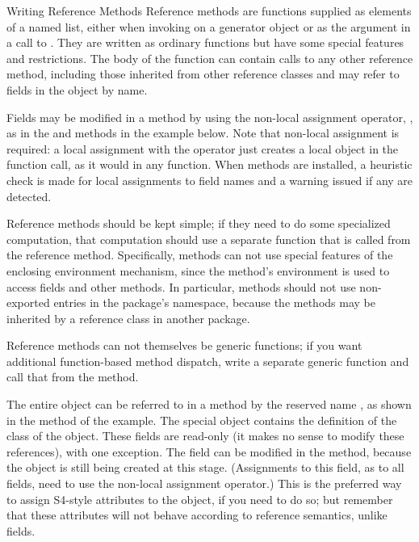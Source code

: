 \begin{Section}{Writing Reference Methods}
Reference methods are functions supplied as elements of a named list,
either
when invoking  
on a generator object  or as
the argument  in a call to .
They are written as ordinary \R{} functions but have some special
features and restrictions.
The body of the function can contain calls to any other reference method,
including those inherited from other reference classes and may refer
to fields in the object by name.

Fields may be modified in a method by using the
non-local assignment operator, \code{<{}<-}, as in the  and 
methods in the example below.
Note that non-local assignment is required:  a local assignment with
the \code{<-} operator just creates a local object in the function
call, as it would in any \R{} function.
When methods are installed, a heuristic check is made for local
assignments to field names and a warning issued if any are detected.

Reference methods should be kept simple; if they need to do some
specialized \R{} computation, that computation should use a separate \R{}
function that is called from the reference method.
Specifically, methods can not use special features of the
enclosing environment mechanism, since the method's environment is
used to access fields and other methods.
In particular, methods should not use non-exported entries in the
package's namespace, because the methods may be inherited by a
reference class in another package.

Reference methods can not themselves be generic functions; if you want
additional function-based method dispatch, write a separate generic
function and call that from the method.

The entire object can be referred to in a method by the reserved
name , as shown in the  method of the
example.
The special object  contains the definition of the
class of the object.
These fields are read-only (it makes no sense to modify these
references), with one exception.
The  field can be modified in the  
method, because the object is still being created at this stage.
(Assignments to this field, as to all fields, need to use the
non-local assignment operator.)
This is the preferred way to assign S4-style attributes to the object,
if you need to do so; but remember that these attributes will not
behave according to reference semantics, unlike fields.


\end{Section}
